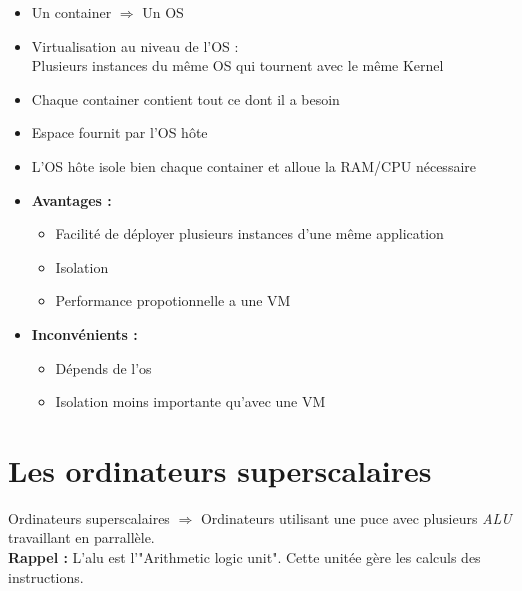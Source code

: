 \documentclass[a4paper]{article}
\begin{document}
    \begin{itemize}
      \item Un container $\Rightarrow$ Un OS
      \item Virtualisation au niveau de l'OS :\\ Plusieurs instances du même OS qui tournent avec le même Kernel
      \item Chaque container contient tout ce dont il a besoin
      \item Espace fournit par l'OS hôte
      \item L'OS hôte isole bien chaque container et alloue la RAM/CPU nécessaire
      \item \textbf{Avantages :}
      \begin{itemize}
        \item Facilité de déployer plusieurs instances d'une même application
        \item Isolation
        \item Performance propotionnelle a une VM
      \end{itemize}
      \item \textbf{Inconvénients :}
      \begin{itemize}
        \item Dépends de l'os
        \item Isolation moins importante qu'avec une VM
      \end{itemize}
    \end{itemize}
















  \newpage
  \section{Les ordinateurs superscalaires}
    Ordinateurs superscalaires $\Rightarrow$ Ordinateurs utilisant une puce avec plusieurs \emph{ALU} travaillant en parrallèle.\\
    \textbf{Rappel :} L'alu est l'"Arithmetic logic unit". Cette unitée gère les calculs des instructions.
\end{document}
